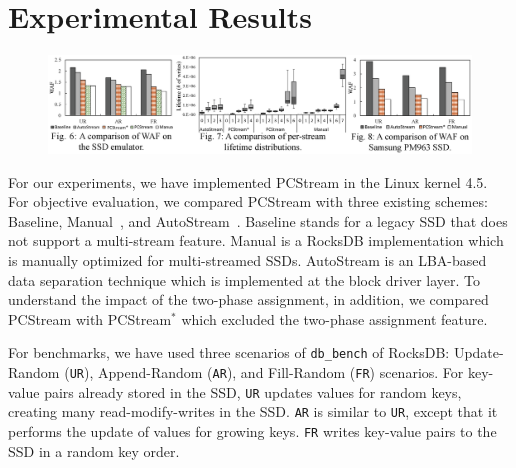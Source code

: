 \vspace{-10pt}
\section{Experimental Results}
\vspace{-5pt}

\begin{figure}[t]
	\centering
	\includegraphics[width=1\textwidth]{figure/expfig}
	\label{fig:exp}
	\vspace{-35pt}
\end{figure}

For our experiments, we have implemented \textsf{\small PCStream} in the Linux kernel
4.5.  For objective evaluation, we compared \textsf{\small PCStream} with three
existing schemes: \textsf{\small Baseline}, \textsf{\small Manual}~\cite{MultiStream}, and
\textsf{\small AutoStream}~\cite{AutoStream}.  \textsf{\small Baseline} stands for a legacy
SSD that does not support a multi-stream feature. \textsf{\small Manual} is a RocksDB
implementation which is manually optimized for multi-streamed SSDs.
\textsf{\small AutoStream} is an LBA-based data separation technique which is
implemented at the block driver layer. To understand the impact of the
two-phase assignment, in addition, we compared \textsf{\small PCStream} with
\textsf{\small PCStream$^{*}$} which excluded the two-phase assignment feature.

For benchmarks, we have used three scenarios of \texttt{db\_bench} of RocksDB:
Update-Random (\texttt{UR}), Append-Random (\texttt{AR}), and Fill-Random
(\texttt{FR}) scenarios.  For key-value pairs already stored in the SSD,
\texttt{UR} updates values for random keys, creating many
read-modify-writes in the SSD.  \texttt{AR} is similar to \texttt{UR}, except
that it performs the update of values for growing keys. \texttt{FR} writes
key-value pairs to the SSD in a random key order.

